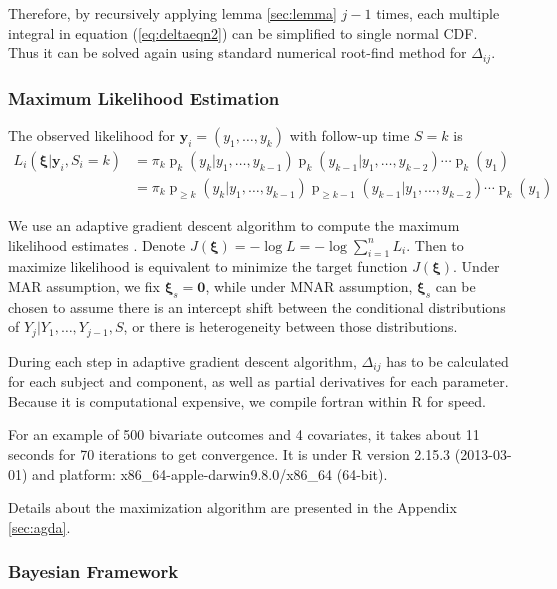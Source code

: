 \documentclass[12pt]{article}
\DeclareMathOperator{\pr}{p}
\begin{document}
\begin{itemize}
  Therefore, by recursively applying lemma \ref{sec:lemma} $j-1$
  times, each multiple integral in equation (\ref{eq:deltaeqn2}) can
  be simplified to single normal CDF. Thus it can be solved again
  using standard numerical root-find method for $\Delta_{ij}$.

\end{itemize}

\subsubsection{Maximum Likelihood Estimation}
\label{sec:mle}

The observed likelihood for $\bm y_i = (y_1, \ldots, y_k)$ with
follow-up time $S = k$ is
\begin{align} \label{eq:ll} L_i(\bm \xi| \bm y_i, S_{i} = k) & =
  \pi_k\pr_k (y_k | y_1, \ldots, y_{k-1})
  \pr_k (y_{k-1}|y_1, \ldots, y_{k-2}) \cdots \pr_{k} (y_1) \\
  & = \pi_k \pr_{\geq k} (y_k | y_1, \ldots, y_{k-1}) \pr_{\geq k-1}
  (y_{k-1}|y_1, \ldots, y_{k-2}) \cdots \pr_{k} (y_1) \nonumber
\end{align}

We use an adaptive gradient descent algorithm to compute the maximum
likelihood estimates \citep{ried1993}. Denote $J(\bm \xi) = - \log L =
- \log \sum_{i = 1}^n L_i$.  Then to maximize likelihood is equivalent
to minimize the target function $J(\bm \xi)$. Under MAR assumption, we
fix $\bm \xi_s = \bm 0$, while under MNAR assumption, $\bm \xi_s $ can
be chosen to assume there is an intercept shift between the
conditional distributions of $Y_{j}| Y_{1}, \ldots, Y_{j-1}, S$, or
there is heterogeneity between those distributions.

During each step in adaptive gradient descent algorithm, $\Delta_{ij}$
has to be calculated for each subject and component, as well as
partial derivatives for each parameter. Because it is computational
expensive, we compile fortran within R for speed.

For an example of 500 bivariate outcomes and 4 covariates, it takes
about 11 seconds for 70 iterations to get convergence. It is under R
version 2.15.3 (2013-03-01) \citep{R} and platform:
x86\_64-apple-darwin9.8.0/x86\_64 (64-bit).

Details about the maximization algorithm are presented in the Appendix
\ref{sec:agda}.

\subsubsection{Bayesian Framework}
\label{sec:bayesian}
\end{document}
